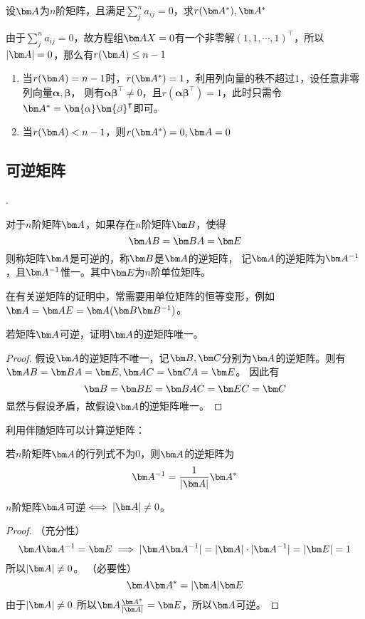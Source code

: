 \begin{example}
    设$\mat{A}$为$n$阶矩阵，且满足$\sum_j^n a_{ij} = 0$，求$r(\mat{A}^*),\mat{A}^*$
\end{example}
\begin{solution}
    由于$\sum_j^n a_{ij} = 0$，故方程组$\mat{AX}=0$有一个非零解$(1,1,\cdots,1)^\intercal$，所以$|\mat{A}|=0$，那么有$r(\mat{A})\leq n-1$
    \begin{enumerate}[(1)]
        \item 当$r(\mat{A})=n-1$时，$r(\mat{A}^*)=1$，利用列向量的秩不超过$1$，设任意非零列向量$\bm{\alpha},\bm{\beta}$，
              则有$\bm{\alpha}\bm{\beta}^\intercal\neq 0$，且$r(\bm{\alpha}\bm{\beta}^\intercal)=1$，此时只需令$\mat{A}^*=\bm{\alpha}\bm{\beta}^\intercal$即可。
        \item 当$r(\mat{A})<n-1$，则$r(\mat{A}^*)=0,\mat{A}=0$
    \end{enumerate}
\end{solution}

\subsection{可逆矩阵}
.
\begin{definition}
    对于$n$阶矩阵$\mat{A}$，如果存在$n$阶矩阵$\mat{B}$，使得
    \[ \mat{AB} = \mat{BA} = \mat{E} \]
    则称矩阵$\mat{A}$是可逆的，称$\mat{B}$是$\mat{A}$的逆矩阵，
    记$\mat{A}$的逆矩阵为$\mat{A}^{-1}$，且$\mat{A}^{-1}$惟一。其中$\mat{E}$为$n$阶单位矩阵。
\end{definition}
在有关逆矩阵的证明中，常需要用单位矩阵的恒等变形，例如$\mat{A}=\mat{AE}=\mat{A}(\mat{B}\mat{B}^{-1})$。
\begin{example}
    若矩阵$\mat{A}$可逆，证明$\mat{A}$的逆矩阵唯一。
\end{example}
\begin{proof}
    假设$\mat{A}$的逆矩阵不唯一，记$\mat{B},\mat{C}$分别为$\mat{A}$的逆矩阵。则有$\mat{AB}=\mat{BA}=\mat{E}, \mat{AC}=\mat{CA}=\mat{E}$。
    因此有
    \[ \mat{B} = \mat{BE} = \mat{BAC} = \mat{EC} = \mat{C} \]
    显然与假设矛盾，故假设$\mat{A}$的逆矩阵唯一。
\end{proof}

利用伴随矩阵可以计算逆矩阵：
\begin{theorem}
    若$n$阶矩阵$\mat{A}$的行列式不为$0$，则$\mat{A}$的逆矩阵为
    \[
        \mat{A}^{-1} = \frac{1}{|\mat{A}|}\mat{A}^*
    \]
\end{theorem}

\begin{theorem}
    $n$阶矩阵$\mat{A}$可逆$\iff |\mat{A}|\neq 0$。
\end{theorem}
\begin{proof}
    （充分性）
    \[ \mat{A}\mat{A}^{-1} = \mat{E} \implies |\mat{A}\mat{A}^{-1}| = |\mat{A}|\cdot|\mat{A}^{-1}| = |\mat{E}| = 1 \]
    所以$|\mat{A}|\neq 0$。
    （必要性）
    \[ \mat{A}\mat{A}^* = |\mat{A}|\mat{E} \]
    由于$|\mat{A}|\neq 0$
    所以$\mat{A} \frac{\mat{A}^*}{|\mat{A}|} = \mat{E}$，所以$\mat{A}$可逆。
\end{proof}

